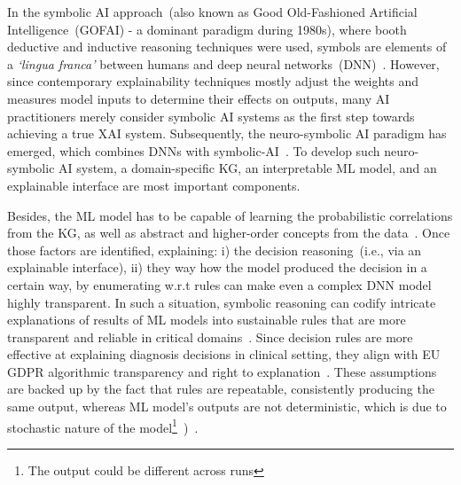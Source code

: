 \hspace*{3.5mm} In the symbolic AI approach~(also known as Good Old-Fashioned Artificial Intelligence~(GOFAI) - a dominant paradigm during 1980s), where booth deductive and inductive reasoning techniques were used, symbols are elements of a \textit{`lingua franca'} between humans and deep neural networks~(DNN)~\cite{janssens2007dynamic}. However, since contemporary explainability techniques mostly adjust the weights and measures model inputs to determine their effects on outputs, many AI practitioners merely consider symbolic AI systems as the first step towards achieving a true XAI system. 
Subsequently, the neuro-symbolic AI paradigm has emerged, which combines DNNs with symbolic-AI~\cite{futia2020integration}.  %
To develop such neuro-symbolic AI system, a domain-specific KG, an interpretable ML model, and an explainable interface are most important components. 

\hspace*{3.5mm} Besides, the ML model has to be capable of learning the probabilistic correlations from the KG, as well as abstract and higher-order concepts from the data~\cite{SAI}. Once those factors are identified, explaining: i) the decision reasoning~(i.e., via an explainable interface), ii) they way how the model produced the decision in a certain way, by enumerating w.r.t rules can make even a complex DNN model highly transparent. In such a situation, symbolic reasoning can codify intricate explanations of results of ML models into sustainable rules that are more transparent and reliable in critical domains~\cite{futia2020integration}. Since decision rules are more effective at explaining diagnosis decisions in clinical setting, they align with EU GDPR algorithmic transparency and right to explanation~\cite{kaminski2019right}.
These assumptions are backed up by the fact that rules are repeatable, consistently producing the same output, whereas ML model's outputs are not deterministic, which is due to stochastic nature of the model\footnote{The output could be different across runs}~\cite{karim2019onconetexplainer})~\cite{alshahrani2017neuro}.

